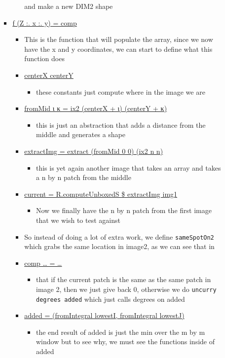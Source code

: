 \documentclass{article}
\begin{document}
\begin{enumerate}
\begin{itemize}
\begin{itemize}
\begin{itemize}
and make a new DIM2 shape
\end{itemize}
\item \uline{f (Z :. x :. y) = comp}
\begin{itemize}
\item This is the function that will populate the array, since we now
have the x and y coordinates, we can start to define what this
function does
\item \uline{centerX  centerY}
\begin{itemize}
\item these constants just compute where in the image we are
\end{itemize}
\item \uline{fromMid ι κ = ix2 (centerX + ι) (centerY + κ)}
\begin{itemize}
\item this is just an abstraction that adds a distance from the
middle and generates a shape
\end{itemize}
\item \uline{extractImg = extract (fromMid 0 0) (ix2 n n)}
\begin{itemize}
\item this is yet again another image that takes an array and takes a
n by n patch from the middle
\end{itemize}
\item \uline{current = R.computeUnboxedS \$ extractImg img1}
\begin{itemize}
\item Now we finally have the n by n patch from the first image that
we wish to test against
\end{itemize}
\item So instead of doing a lot of extra work, we define \texttt{sameSpotOn2}
      which grabs the same location in image2, as we can see that in
\item \uline{comp \ldots{} = \ldots{}}
\begin{itemize}
\item that if the current patch is the same as the same patch in
image 2, then we just give back 0, otherwise we do \texttt{uncurry degrees added}
which just calls degrees on added
\end{itemize}
\item \uline{added = (fromIntegral lowestI, fromIntegral lowestJ)}
\begin{itemize}
\item the end result of added is just the min over the m by m window
but to see why, we must see the functions inside of added

\end{itemize}
\end{itemize}
\end{itemize}
\end{itemize}
\end{enumerate}
\end{document}
